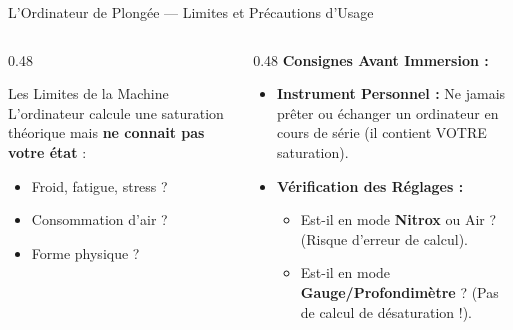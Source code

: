 \begin{frame}{L'Ordinateur de Plongée — Limites et Précautions d'Usage}
    \begin{columns}[t]
        \begin{column}{0.48\textwidth}
            \begin{alertblock}{Les Limites de la Machine}
                L'ordinateur calcule une saturation théorique mais \textbf{ne connait pas votre état} :
                \begin{itemize}
                    \item Froid, fatigue, stress ?
                    \item Consommation d'air ?
                    \item Forme physique ?
                \end{itemize}
            \end{alertblock}
        \end{column}

        \begin{column}{0.48\textwidth}
            \textbf{Consignes Avant Immersion :}
            \begin{itemize}
                \item \textbf{Instrument Personnel :} Ne jamais prêter ou échanger un ordinateur en cours de série (il contient VOTRE saturation).
                \item \textbf{Vérification des Réglages :}
                \begin{itemize}
                    \item Est-il en mode \textbf{Nitrox} ou Air ? (Risque d'erreur de calcul).
                    \item Est-il en mode \textbf{Gauge/Profondimètre} ? (Pas de calcul de désaturation !).
                \end{itemize}
            \end{itemize}
        \end{column}
    \end{columns}
\end{frame}

